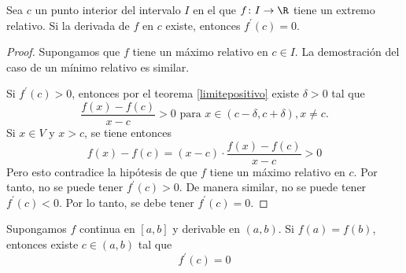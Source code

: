 \begin{theorem}
	\label{extrint}
	Sea \(c \) un punto interior del intervalo \(I \) en el que \(f \colon I \to \R \) tiene un extremo relativo. Si la derivada de \(f \) en \(c \) existe, entonces \(f^\prime (c) = 0\).  
\end{theorem}
\begin{proof}
	Supongamos que \(f \) tiene un máximo relativo en \(c \in I\). La demostración del caso de un mínimo relativo es similar. 
	
	Si \(f^\prime (c) > 0\), entonces por el teorema \ref{limitepositivo} existe \(\delta > 0 \) tal que
	\[
		\frac{f(x) - f(c)}{x - c} > 0 \text{ para } x \in (c - \delta, c + \delta), x \neq c. 
	\]
	Si \(x \in V\) y \(x > c \), se tiene entonces 
	\[
		f(x) - f(c) = (x - c ) \cdot \frac{f(x) - f(c )}{x - c } > 0 
	\]
	Pero esto contradice la hipótesis de que \(f \) tiene un máximo relativo en \(c \). Por tanto, no se puede tener \(f^\prime (c) > 0\). De manera similar, no se puede tener \(f^\prime (c) <0 \). Por lo tanto, se debe tener \(f^\prime (c) = 0\).   
\end{proof}

\begin{theorem}[de Rolle]
	Supongamos \(f \) continua en \([a,b ]\) y derivable en \((a,b )\). Si \(f(a) = f(b )\), entonces existe \(c \in (a,b )\) tal que
	\[
		f^\prime (c) = 0
	\]
\end{theorem}

